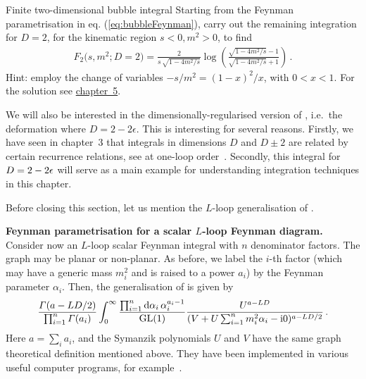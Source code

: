 \begin{exer}{Finite two-dimensional bubble integral}
\label{Ex:4.2Dbubble}
Starting from the Feynman parametrisation in eq. (\ref{eq:bubbleFeynman}), carry out the remaining integration for $D=2$, for the kinematic region $s<0, m^2>0$, to find
\begin{align}\label{resbubbleexplicit}
F_{2}\bigl(s,m^2;D=2\bigr) =  \frac{2}{s \, \sqrt{1-4 m^2/s}} \log \left(  \frac{\sqrt{1-4 m^2/s}-1}{\sqrt{1-4 m^2/s}+1} \right) \,.
\end{align}
Hint: employ the change of variables $-s/m^2 = (1-x)^2/x$, with $0<x<1$.
For the solution see \hyperref[Sol:4.2Dbubble]{chapter~5}.
\end{exer}
We will also be interested in the dimensionally-regularised version of , i.e.\ the deformation where $D=2-2 \epsilon$. 
This is interesting for several reasons. Firstly, we have seen in chapter~3 that integrals in dimensions $D$ and $D\pm 2$ are related by certain recurrence relations, see  at one-loop order~\cite{ch4Lee:2012cn}.
Secondly, this integral for $D=2-2\epsilon$ will serve as a main example for understanding integration techniques in this chapter.  


Before closing this section, let us mention the $L$-loop generalisation of .
\begin{svgraybox}
{\bf Feynman parametrisation for a scalar $L$-loop Feynman diagram.}
Consider now an $L$-loop scalar Feynman integral with $n$ denominator factors.
The graph may be planar or non-planar. As before, we label the $i$-th factor (which may have a generic mass $m_i^2$ and is raised to a power $a_i$) by the Feynman parameter $\alpha_i$.
Then, the generalisation of  is given by
\begin{align}\label{FeynmanLloopgeneralization}
\frac{\Gamma(a-L D/2)}{\prod_{i=1}^{n} \Gamma(a_{i})}  
\int_{0}^{\infty}  \frac{   \prod_{i=1}^{n} 
 \d\alpha_{i} \, \alpha_{i}^{a_{i}-1} }{ {\rm GL}(1)} 
\frac{U^{a-L D} }{ (V + U \sum_{i=1}^{n} m_{i}^2 \alpha_i  -\i 0)^{a-L D/2}} \,.
\end{align}
Here $a= \sum_i a_i$, and the Symanzik polynomials $U$ and $V$ have the same graph theoretical definition mentioned above.
They have been implemented in various useful computer programs, for example~\cite{ch4Lee:2012cn}. 
\end{svgraybox}



